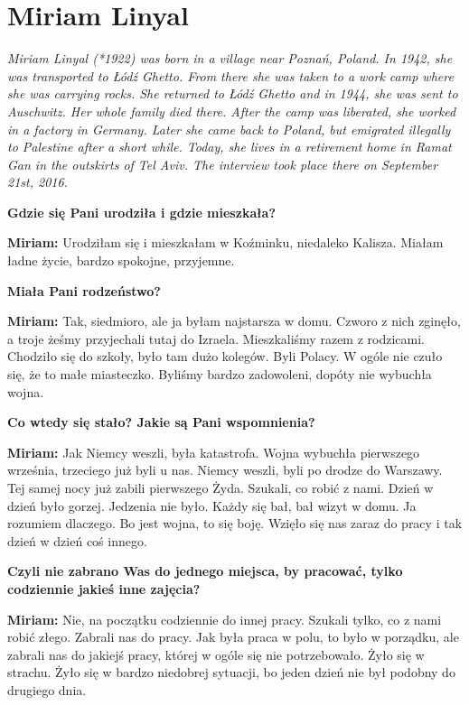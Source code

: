 \section{Miriam Linyal}
\begin{otherlanguage}{polish}
\textit{Miriam Linyal (*1922) was born in a village near Poznań, Poland. In 1942, she was transported to Łódź Ghetto. From there she was taken to a work camp where she was carrying rocks. She returned to Łódź Ghetto and in 1944, she was sent to Auschwitz. Her whole family died there. After the camp was liberated, she worked in a factory in Germany. Later she came back to Poland, but emigrated illegally to Palestine after a short while. Today, she lives in a retirement home in Ramat Gan in the outskirts of Tel Aviv. The interview took place there on September 21st, 2016.}\par
\vspace*{2em}
\textbf{Gdzie się Pani urodziła i gdzie mieszkała?} 

\textbf{Miriam:} Urodziłam się i mieszkałam w Koźminku, niedaleko Kalisza. Miałam ładne życie, bardzo spokojne, przyjemne.

\textbf{Miała Pani rodzeństwo?} 

\textbf{Miriam:} Tak, siedmioro, ale ja byłam najstarsza w domu. Czworo z nich zginęło, a troje żeśmy przyjechali tutaj do Izraela. Mieszkaliśmy razem z rodzicami. Chodziło się do szkoły, było tam dużo kolegów. Byli Polacy. W ogóle nie czuło się, że to małe miasteczko. Byliśmy bardzo zadowoleni, dopóty nie wybuchła wojna.

\textbf{Co wtedy się stało? Jakie są Pani wspomnienia?} 

\textbf{Miriam:} Jak Niemcy weszli, była katastrofa. Wojna wybuchła pierwszego września, trzeciego już byli u nas. Niemcy weszli, byli po drodze do Warszawy. Tej samej nocy już zabili pierwszego Żyda. Szukali, co robić z nami. Dzień w dzień było gorzej. Jedzenia nie było. Każdy się bał, bał wizyt w domu. Ja rozumiem dlaczego. Bo jest wojna, to się boję. Wzięło się nas zaraz do pracy i tak dzień w dzień coś innego.

\textbf{Czyli nie zabrano Was do jednego miejsca, by pracować, tylko codziennie jakieś inne zajęcia?} 

\textbf{Miriam:} Nie, na początku codziennie do innej pracy. Szukali tylko, co z nami robić złego. Zabrali nas do pracy. Jak była praca w polu, to było w porządku, ale zabrali nas do jakiejś pracy, której w ogóle się nie potrzebowało. Żyło się w strachu. Żyło się w bardzo niedobrej sytuacji, bo jeden dzień nie był podobny do drugiego dnia. 


\end{otherlanguage}
